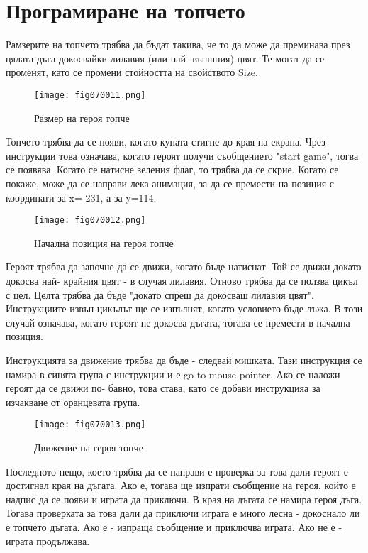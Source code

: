 \section{Програмиране на топчето}
Рамзерите на топчето трябва да бъдат такива, че то да може да преминава през цялата дъга докосвайки лилавия (или най- външния) цвят. Те могат да се променят, като се промени стойността на свойството Size.

\begin{figure}[H]
  \centering
  \texttt{[image: fig070011.png]}
  \caption{Размер на героя топче}
\label{fig070011}
\end{figure}

Топчето трябва да се появи, когато купата стигне до края на екрана. Чрез инструкции това означава, когато героят получи съобщението "start game", тогва се появява. Когато се натисне зеления флаг, то трябва да се скрие. Когато се покаже, може да се направи лека анимация, за да се премести на позиция с координати за x=-231, а за y=114.

\begin{figure}[H]
  \centering
  \texttt{[image: fig070012.png]}
  \caption{Начална позиция на героя топче}
\label{fig070012}
\end{figure}

Героят трябва да започне да се движи, когато бъде натиснат. Той се движи докато докосва най- крайния цвят - в случая лилавия. Отново трябва да се ползва цикъл с цел. Целта трябва да бъде "докато спреш да докосваш лилавия цвят". Инструкциите извън цикълът ще се изпълнят, когато условието бъде лъжа. В този случай означава, когато героят не докосва дъгата, тогава се премести в начална позиция.

Инструкцията за движение трябва да бъде - следвай мишката. Тази инструкция се намира в синята група с инструкции и е go to mouse-pointer. Ако се наложи героят да се движи по- бавно, това става, като се добави инструкцияа за изчакване от оранцевата група.

\begin{figure}[H]
  \centering
  \texttt{[image: fig070013.png]}
  \caption{Движение на героя топче}
\label{fig070013}
\end{figure}

Последното нещо, което трябва да се направи е проверка за това дали героят е достигнал края на дъгата. Ако е, тогава ще изпрати съобщение на героя, който е надпис да се появи и играта да приключи. В края на дъгата се намира героя дъга. Тогава проверката за това дали да приключи играта е много лесна - докоснало ли е топчето дъгата. Ако е - изпраща съобщение и приключва играта. Ако не е - играта продължава.

